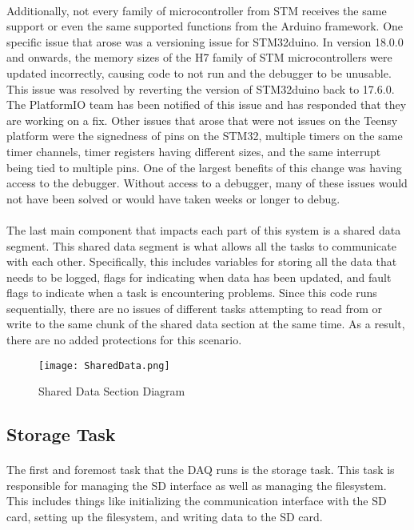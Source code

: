 \paragraph{}
Additionally, not every family of microcontroller from STM receives the same support or even the same supported functions from the Arduino framework.
One specific issue that arose was a versioning issue for STM32duino.
In version 18.0.0 and onwards, the memory sizes of the H7 family of STM microcontrollers were updated incorrectly, causing code to not run and the debugger to be unusable.
This issue was resolved by reverting the version of STM32duino back to 17.6.0.
The PlatformIO team has been notified of this issue and has responded that they are working on a fix.
Other issues that arose that were not issues on the Teensy platform were the signedness of pins on the STM32, multiple timers on the same timer channels, timer registers having different sizes, and the same interrupt being tied to multiple pins.
One of the largest benefits of this change was having access to the debugger.
Without access to a debugger, many of these issues would not have been solved or would have taken weeks or longer to debug.

\paragraph{}
The last main component that impacts each part of this system is a shared data segment.
This shared data segment is what allows all the tasks to communicate with each other.
Specifically, this includes variables for storing all the data that needs to be logged, flags for indicating when data has been updated, and fault flags to indicate when a task is encountering problems.
Since this code runs sequentially, there are no issues of different tasks attempting to read from or write to the same chunk of the shared data section at the same time.
As a result, there are no added protections for this scenario.

\begin{figure}[H]
	\centering
	\texttt{[image: SharedData.png]}
	\caption{Shared Data Section Diagram}
	\label{fig:SharedData}
\end{figure}

\subsection{Storage Task}

\paragraph{}
The first and foremost task that the DAQ runs is the storage task.
This task is responsible for managing the SD interface as well as managing the filesystem.
This includes things like initializing the communication interface with the SD card, setting up the filesystem, and writing data to the SD card.

